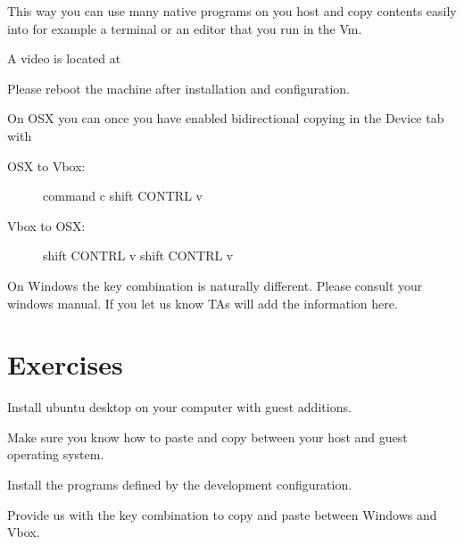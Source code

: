 This way you can use many native programs on you host and copy contents
easily into for example a terminal or an editor that you run in the Vm.

A video is located at



Please reboot the machine after installation and configuration.

On OSX you can once you have enabled bidirectional copying in the Device
tab with

\begin{description}
\item[OSX to Vbox:] command c shift CONTRL v
\item[Vbox to OSX:] shift CONTRL v shift CONTRL v
\end{description}

\begin{NOTE}
  On Windows the key combination is naturally different. Please
  consult your windows manual. If you let us know TAs will add the
  information here.
\end{NOTE}




\section{Exercises}

\begin{exercise}
\label{E:Virtualbox.1} Install ubuntu desktop on your computer with
  guest additions.
\end{exercise}

\begin{exercise}\label{E:Virtualbox.2} Make sure you know how to paste and copy between
  your host and guest operating system.
\end{exercise}

\begin{exercise}\label{E:Virtualbox.3} Install the programs defined by the development
  configuration.
\end{exercise}

\begin{exercise}\label{E:Virtualbox.4} Provide us with the key combination to copy and
  paste between Windows and Vbox.
\end{exercise}

